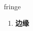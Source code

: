 
\begin{frame}
{\huge fringe}
\begin{center}
\begin{enumerate}\Large
  \item \textbf{边缘}
\end{enumerate}
\end{center}
\end{frame}
